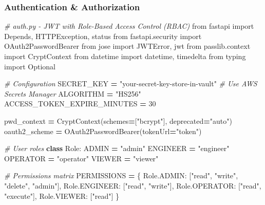 \documentclass[
]{article}
\newenvironment{Shaded}{\begin{snugshade}}{\end{snugshade}}
\newcommand{\CommentTok}[1]{\textcolor[rgb]{0.56,0.35,0.01}{\textit{#1}}}
\newcommand{\DecValTok}[1]{\textcolor[rgb]{0.00,0.00,0.81}{#1}}
\newcommand{\ImportTok}[1]{#1}
\newcommand{\KeywordTok}[1]{\textcolor[rgb]{0.13,0.29,0.53}{\textbf{#1}}}
\newcommand{\NormalTok}[1]{#1}
\newcommand{\OperatorTok}[1]{\textcolor[rgb]{0.81,0.36,0.00}{\textbf{#1}}}
\newcommand{\StringTok}[1]{\textcolor[rgb]{0.31,0.60,0.02}{#1}}
\begin{document}
\hypertarget{authentication-authorization}{%
\subsubsection{Authentication \&
Authorization}\label{authentication-authorization}}

\begin{Shaded}
\begin{Highlighting}[]
\CommentTok{\# auth.py {-} JWT with Role{-}Based Access Control (RBAC)}
\ImportTok{from}\NormalTok{ fastapi }\ImportTok{import}\NormalTok{ Depends, HTTPException, status}
\ImportTok{from}\NormalTok{ fastapi.security }\ImportTok{import}\NormalTok{ OAuth2PasswordBearer}
\ImportTok{from}\NormalTok{ jose }\ImportTok{import}\NormalTok{ JWTError, jwt}
\ImportTok{from}\NormalTok{ passlib.context }\ImportTok{import}\NormalTok{ CryptContext}
\ImportTok{from}\NormalTok{ datetime }\ImportTok{import}\NormalTok{ datetime, timedelta}
\ImportTok{from}\NormalTok{ typing }\ImportTok{import}\NormalTok{ Optional}

\CommentTok{\# Configuration}
\NormalTok{SECRET\_KEY }\OperatorTok{=} \StringTok{"your{-}secret{-}key{-}store{-}in{-}vault"}  \CommentTok{\# Use AWS Secrets Manager}
\NormalTok{ALGORITHM }\OperatorTok{=} \StringTok{"HS256"}
\NormalTok{ACCESS\_TOKEN\_EXPIRE\_MINUTES }\OperatorTok{=} \DecValTok{30}

\NormalTok{pwd\_context }\OperatorTok{=}\NormalTok{ CryptContext(schemes}\OperatorTok{=}\NormalTok{[}\StringTok{"bcrypt"}\NormalTok{], deprecated}\OperatorTok{=}\StringTok{"auto"}\NormalTok{)}
\NormalTok{oauth2\_scheme }\OperatorTok{=}\NormalTok{ OAuth2PasswordBearer(tokenUrl}\OperatorTok{=}\StringTok{"token"}\NormalTok{)}

\CommentTok{\# User roles}
\KeywordTok{class}\NormalTok{ Role:}
\NormalTok{    ADMIN }\OperatorTok{=} \StringTok{"admin"}
\NormalTok{    ENGINEER }\OperatorTok{=} \StringTok{"engineer"}
\NormalTok{    OPERATOR }\OperatorTok{=} \StringTok{"operator"}
\NormalTok{    VIEWER }\OperatorTok{=} \StringTok{"viewer"}

\CommentTok{\# Permissions matrix}
\NormalTok{PERMISSIONS }\OperatorTok{=}\NormalTok{ \{}
\NormalTok{    Role.ADMIN: [}\StringTok{"read"}\NormalTok{, }\StringTok{"write"}\NormalTok{, }\StringTok{"delete"}\NormalTok{, }\StringTok{"admin"}\NormalTok{],}
\NormalTok{    Role.ENGINEER: [}\StringTok{"read"}\NormalTok{, }\StringTok{"write"}\NormalTok{],}
\NormalTok{    Role.OPERATOR: [}\StringTok{"read"}\NormalTok{, }\StringTok{"execute"}\NormalTok{],}
\NormalTok{    Role.VIEWER: [}\StringTok{"read"}\NormalTok{]}
\NormalTok{\}}


\end{Highlighting}
\end{Shaded}
\end{document}
